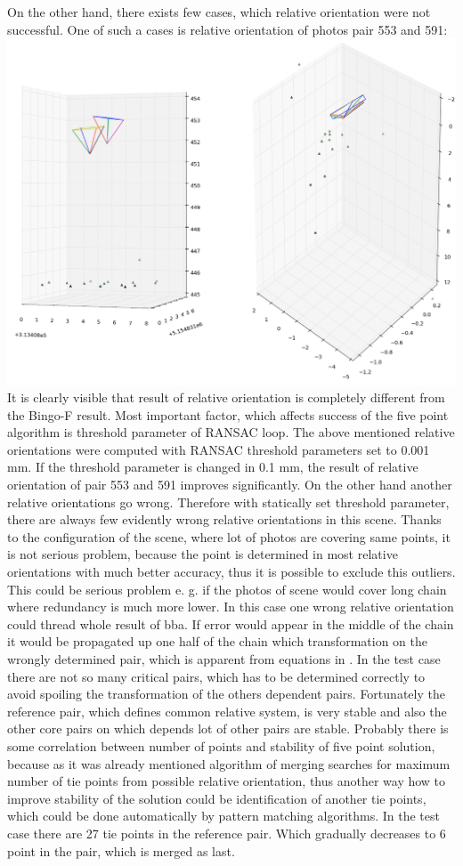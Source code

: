 \documentclass[a4paper,12pt]{article}
\begin{document}
On the other hand, there exists  few cases, which relative orientation were not successful.  
One of such a cases is relative orientation of photos pair 553 and 591:  
\includegraphics[scale=0.4]{figures/rel_or_553_591.png}
It is clearly visible that result of relative orientation is completely different from the Bingo-F result.
Most important factor, which affects success of the five point algorithm is threshold parameter of RANSAC loop.
The above mentioned relative orientations were computed with RANSAC threshold parameters set to 0.001 mm.
If the threshold parameter is changed in 0.1 mm, the result of relative orientation of pair 553 and 591 improves significantly.
On the other hand another relative orientations go wrong. Therefore with statically set threshold parameter, there are always 
few evidently wrong relative orientations in this scene. Thanks to the configuration of the scene, where lot of photos are 
covering same points, it is  not serious problem, because the point is determined in most relative orientations  with 
much better accuracy, thus it is possible to exclude this outliers. This could be serious problem e. g. if the photos 
of scene would cover long chain where redundancy is much more lower.   
In this case one wrong relative orientation could thread whole result of bba. If error would appear in the middle 
of the chain it would  be propagated up  one half of the chain which transformation on the wrongly
determined pair, which is apparent from equations in \label{eq:comm_rel}. 
In the test case there are not so many critical pairs, which has to be determined correctly to avoid spoiling the transformation 
of the others dependent pairs. Fortunately the reference pair, which defines common relative system, is very stable and also 
the other  core pairs on which depends lot of other pairs are stable. Probably there is some correlation between number 
of points and stability of five point solution, because as it was already mentioned algorithm of merging searches 
for maximum number of tie points from possible relative orientation, thus another way how to improve stability of the solution 
could be identification of another tie points, which could be done automatically by pattern matching algorithms. 
In the test case there 
are 27 tie points in the reference pair. Which gradually decreases to 6 point in the pair, which is merged as last.
\end{document}
